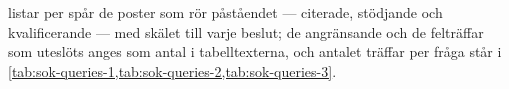  listar per spår de poster som
rör påståendet --- citerade, stödjande och kvalificerande --- med skälet
till varje beslut; de angränsande och de felträffar som uteslöts anges
som antal i tabelltexterna, och antalet träffar per fråga står i
\cref{tab:sok-queries-1,tab:sok-queries-2,tab:sok-queries-3}.
